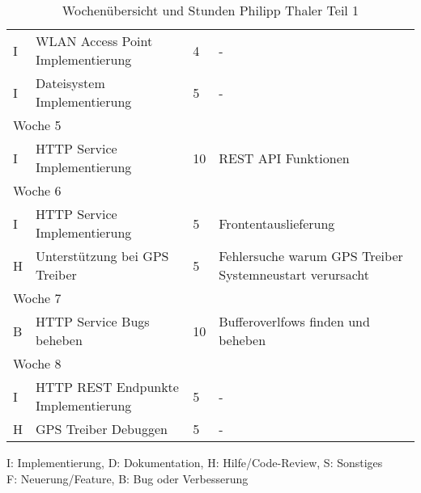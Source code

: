 \begin{table}[!hp]
\begin{center}
\begin{tabular}{|p{0.8cm}|p{6cm}|p{0.8cm}|p{8cm}|}
            I            & WLAN Access Point Implementierung         & 4             & -                                                               \\
            I            & Dateisystem Implementierung               & 5             & -                                                               \\ \hline
            \multicolumn{4}{|l|}{Woche 5}                                                                                                              \\ \hline
            I            & HTTP Service Implementierung              & 10            & REST API Funktionen                                             \\ \hline
            \multicolumn{4}{|l|}{Woche 6}                                                                                                              \\ \hline
            I            & HTTP Service Implementierung              & 5             & Frontentauslieferung                                            \\
            H            & Unterstützung bei GPS Treiber             & 5             & Fehlersuche warum GPS Treiber Systemneustart verursacht         \\ \hline
            \multicolumn{4}{|l|}{Woche 7}                                                                                                              \\ \hline
            B            & HTTP Service Bugs beheben                 & 10            & Bufferoverlfows finden und beheben                              \\ \hline
            \multicolumn{4}{|l|}{Woche 8}                                                                                                              \\ \hline
            I            & HTTP REST Endpunkte Implementierung       & 5             & -                                                               \\
            H            & GPS Treiber Debuggen                      & 5             & -                                                               \\ \hline
        \end{tabular}
        \label{tab:overviewPhilipp1}
    \end{center}
    \caption{Wochenübersicht und Stunden Philipp Thaler Teil 1}
    I: Implementierung, D: Dokumentation, H: Hilfe/Code-Review, S: Sonstiges\\
    F: Neuerung/Feature, B: Bug oder Verbesserung\\

\end{table}

